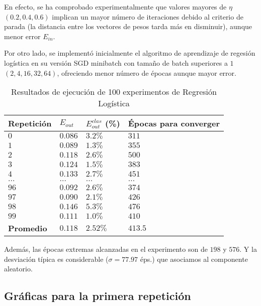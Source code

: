 En efecto, se ha comprobado experimentalmente que valores mayores de $\eta$
$(0.2, 0.4, 0.6)$ implican un mayor número de iteraciones debido al criterio de
parada (la distancia entre los vectores de pesos tarda más en disminuir), aunque
menor error $E_{in}$.

Por otro lado, se implementó inicialmente el algoritmo de aprendizaje de
regesión logística en su versión SGD minibatch con tamaño de batch superiores a $1$
$(2, 4, 16, 32, 64)$, ofreciendo menor número de épocas aunque mayor error.

\begin{table}[H]
    \centering
    \begin{tabular}{llll}
    \toprule
        Repetición & $E_{out}$ & $E_{out}^{clas}$ (\%) & Épocas para converger \\ \midrule
        $0$ & $0.086$ & $3.2 \%$ & $311$ \hfill \\
        $1$ & $0.089$ & $1.3 \%$ & $355$ \hfill \\
        $2$ & $0.118$ & $2.6 \%$ & $500$ \hfill\\
        $3$ & $0.124$ & $1.5 \%$ & $383$ \hfill \\
        $4$ & $0.133$ & $2.7 \%$ & $451$ \hfill \\
        $\dots$ & $\dots$ & $\dots$ & $\dots$ \hfill \\
        $96$ & $0.092$ & $2.6 \%$ & $374$ \hfill \\
        $97$ & $0.090$ & $2.1 \%$ & $426$ \hfill \\
        $98$ & $0.146$ & $5.3 \%$ & $476$ \hfill \\
        $99$ & $0.111$ & $1.0 \%$ & $410$ \hfill \\ \bottomrule
        \textbf{Promedio} & \textbf{$0.118$} & \textbf{$2.52 \%$} & \textbf{$413.5$} \\ \bottomrule
    \end{tabular}
    \caption{Resultados de ejecución de 100 experimentos de Regresión Logística}
\end{table}

Además, las épocas extremas alcanzadas en el experimento son de $198$ y $576$. Y
la desviación típica es considerable ($\sigma = 77.97$ éps.) que asociamos al componente
aleatorio.

\subsection{Gráficas para la primera repetición}

